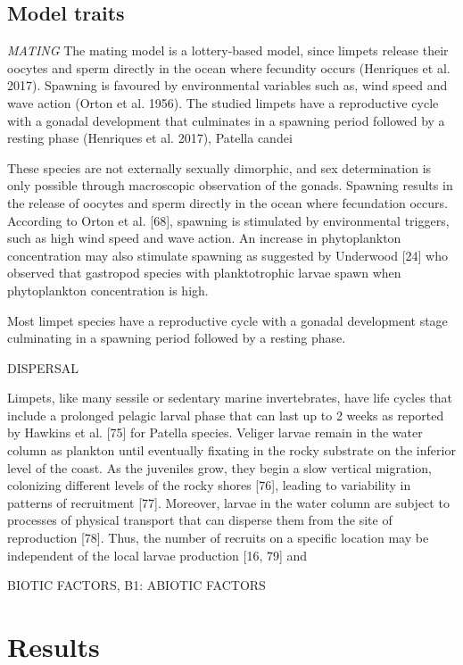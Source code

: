 \documentclass[12pt]{article}
\begin{document}
\begin{flushleft}
\subsection {Model traits}
\textit{MATING}
The mating model is a lottery-based model, since limpets release their oocytes and sperm directly in the ocean where fecundity occurs (Henriques et al. 2017). Spawning is favoured by environmental variables such as, wind speed and wave action (Orton et al. 1956). The studied limpets have a reproductive cycle with a gonadal development that culminates in a spawning period followed by a resting phase (Henriques et al. 2017), Patella candei 


These species are not externally sexually dimorphic, and sex determination is only possible through macroscopic observation of the gonads. Spawning results in the release of oocytes and sperm directly in the ocean where fecundation occurs. According to Orton et al. [68], spawning is stimulated by environmental triggers, such as high wind speed and wave action. An increase in phytoplankton concentration may also stimulate spawning as suggested by Underwood [24] who observed that gastropod species with planktotrophic larvae spawn when phytoplankton concentration is high.

Most limpet species have a reproductive cycle with a gonadal development stage culminating in a spawning period followed by a resting phase. 



DISPERSAL

Limpets, like many sessile or sedentary marine invertebrates, have life cycles that include a prolonged pelagic larval phase that can last up to 2 weeks as reported by Hawkins et al. [75] for Patella species. Veliger larvae remain in the water column as plankton until eventually fixating in the rocky substrate on the inferior level of the coast. As the juveniles grow, they begin a slow vertical migration, colonizing different levels of the rocky shores [76], leading to variability in patterns of recruitment [77]. Moreover, larvae in the water column are subject to processes of physical transport that can disperse them from the site of reproduction [78]. Thus, the number of recruits on a specific location may be independent of the local larvae production [16, 79] and 


BIOTIC FACTORS, B1: 
ABIOTIC FACTORS




\section{Results}




\end{flushleft}
\end{document}
